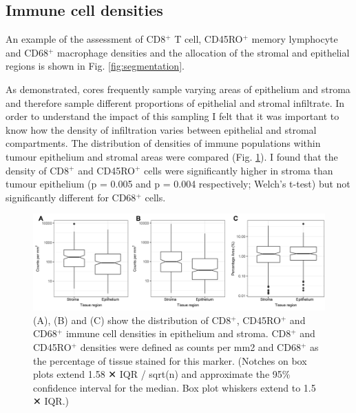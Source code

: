 \subsection{Immune cell densities}

An example of the assessment of CD8$^+$ T cell, CD45RO$^+$ memory lymphocyte and CD68$^+$ macrophage densities and the allocation of the stromal and epithelial regions is shown in Fig. \ref{fig:segmentation}.

As demonstrated, cores frequently sample varying areas of epithelium and stroma and therefore sample different proportions of epithelial and stromal infiltrate. In order to understand the impact of this sampling I felt that it was important to know how the density of infiltration varies between epithelial and stromal compartments. The distribution of densities of immune populations within tumour epithelium and stromal areas were compared (Fig. \ref{fig:distribution_infiltrate}). I found that the density of CD8$^+$ and CD45RO$^+$ cells were significantly higher in stroma than tumour epithelium (p = 0.005 and p = 0.004 respectively; Welch’s t-test) but not significantly different for CD68$^+$ cells. 

\begin{figure}
    \centering
    \includegraphics[width=\textwidth]{Chapter2/Figs/Raster/Montfort-2018_immune_Composition.png}
    \caption[Distribution of immune densities.]{ (A), (B) and (C) show the distribution of CD8$^+$, CD45RO$^+$ and CD68$^+$ immune cell densities in epithelium and stroma. CD8$^+$ and CD45RO$^+$ densities were defined as counts per mm2 and CD68$^+$ as the percentage of tissue stained for this marker. (Notches on box plots extend 1.58 ✕ IQR / sqrt(n) and approximate the 95\% confidence interval for the median. Box plot whiskers extend to 1.5 ✕ IQR.) 
}
    \label{fig:distribution_infiltrate}
\end{figure}

